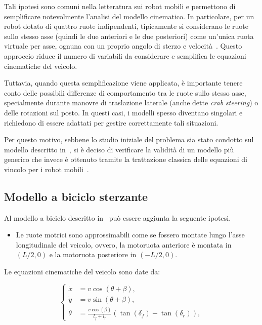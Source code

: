 Tali ipotesi sono comuni nella letteratura sui robot mobili e permettono di semplificare notevolmente l'analisi del modello cinematico. In particolare, per un robot dotato di quattro ruote indipendenti, tipicamente si considerano le ruote sullo stesso asse (quindi le due anteriori e le due posteriori) come un'unica ruota virtuale per asse, ognuna con un proprio angolo di sterzo e velocità~\cite{tourajizadeh2020fourwheel}. Questo approccio riduce il numero di variabili da considerare e semplifica le equazioni cinematiche del veicolo.

Tuttavia, quando questa semplificazione viene applicata, è importante tenere conto delle possibili differenze di comportamento tra le ruote sullo stesso asse, specialmente durante manovre di traslazione laterale (anche dette \textit{crab steering}) o delle rotazioni sul posto. In questi casi, i modelli spesso diventano singolari e richiedono di essere adattati per gestire correttamente tali situazioni.

Per questo motivo, sebbene lo studio iniziale del problema sia stato condotto sul modello descritto in~\cite{tourajizadeh2020fourwheel}, si è deciso di verificare la validità di un modello più generico che invece è ottenuto tramite la trattazione classica delle equazioni di vincolo per i robot mobili~\cite{deluca1998feedback}.

\subsection{Modello a biciclo sterzante}
Al modello a biciclo descritto in~\cite{tourajizadeh2020fourwheel} può essere aggiunta la seguente ipotesi.
\begin{itemize}
    \item Le ruote motrici sono approssimabili come se fossero montate lungo l'asse longitudinale del veicolo, ovvero, la motoruota anteriore è montata in $ (L/2, 0) $ e la motoruota posteriore in $ (-L/2, 0) $.
\end{itemize}

Le equazioni cinematiche del veicolo sono date da:

\begin{equation}
    \label{eq:betamodel}
    \begin{cases}
        \dot{x}      & = v \cos(\theta+\beta),                                                   \\
        \dot{y}      & = v \sin(\theta+\beta),                                                   \\
        \dot{\theta} & = \frac{v\cos(\beta)}{l_f+l_r}\left(\tan(\delta_f)-\tan(\delta_r)\right),
    \end{cases}
\end{equation}

